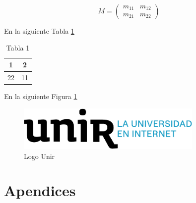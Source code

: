 \documentclass[11pt,a4paper,spanish]{book}
\numberwithin{equation}{chapter}
\numberwithin{figure}{chapter}
\begin{document}
\begin{equation}\label{eq:eq1secCTF}
M=\begin{pmatrix}
	m_{11}&m_{12}\\
	m_{21}&m_{22}
\end{pmatrix}
\end{equation}

En la siguiente Tabla \ref{tab:tab1secCTF}

\begin{table}[h]
\centering
\begin{tabular}{|c|c|}
	\hline
	1 & 2 \\
	\hline
	22 & 11 \\
	\hline
\end{tabular}
\caption{Tabla 1}
\label{tab:tab1secCTF}
\end{table}

En la siguiente Figura \ref{fig:fig1secCTF}

\begin{figure}[h]
\includegraphics[width= 0.8\textwidth]{logo_unir}
\caption{Logo Unir}
\label{fig:fig1secCTF}
\end{figure}





\appendix
\chapter{Apendices}
\end{document}
